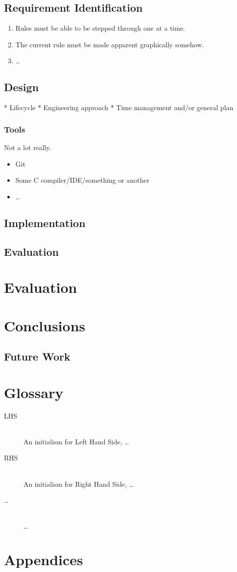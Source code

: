 \documentclass{UoYCSproject}
\begin{document}
\section{Requirement Identification}
\begin{enumerate}
  \item Rules must be able to be stepped through one at a time.
  \item The current rule must be made apparent graphically somehow.
  \item \ldots
\end{enumerate}
\section{Design}
 * Lifecycle
 * Engineering approach
 * Time management and/or general plan
 
\subsection{Tools}
Not a lot really.
\begin{itemize}
  \item Git
  \item Some C compiler/IDE/something or another
  \item \ldots
\end{itemize}
\section{Implementation}
\section{Evaluation}

\chapter{Evaluation}
\chapter{Conclusions}
\section{Future Work}
\chapter{Glossary}
\begin{description}
  \item[LHS] \hfill \\
  An initialism for Left Hand Side, \ldots
  \item[RHS] \hfill \\
  An initialism for Right Hand Side, \ldots
  \item[\ldots] \hfill \\
  \ldots
\end{description}



\chapter{Appendices}
\end{document}

